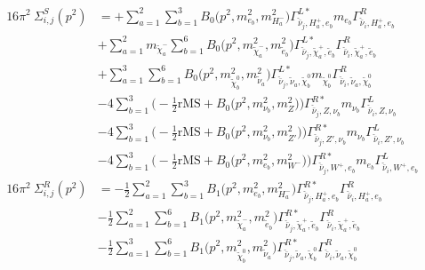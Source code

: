 \begin{itemize}
\begin{align} 
16\pi^2 \ \Sigma^S_{i,j}(p^2) &= +\sum_{a=1}^{2}\sum_{b=1}^{3}{B_0\Big(p^{2},m^2_{e_{{b}}},m^2_{H^-_{{a}}}\Big)} {\Gamma^{L*}_{\check{\bar{\nu}}_{{j}},H^+_{{a}},e_{{b}}}} m_{e_{{b}}} {\Gamma^R_{\check{\bar{\nu}}_{{i}},H^+_{{a}},e_{{b}}}} \nonumber \\ 
 &+\sum_{a=1}^{2}m_{\tilde{\chi}^-_{{a}}} \sum_{b=1}^{6}{B_0\Big(p^{2},m^2_{\tilde{\chi}^-_{{a}}},m^2_{\tilde{e}_{{b}}}\Big)} {\Gamma^{L*}_{\check{\bar{\nu}}_{{j}},\tilde{\chi}^+_{{a}},\tilde{e}_{{b}}}} {\Gamma^R_{\check{\bar{\nu}}_{{i}},\tilde{\chi}^+_{{a}},\tilde{e}_{{b}}}}  \nonumber \\ 
 &+\sum_{a=1}^{3}\sum_{b=1}^{6}{B_0\Big(p^{2},m^2_{\tilde{\chi}^0_{{b}}},m^2_{\tilde{\nu}_{{a}}}\Big)} {\Gamma^{L*}_{\check{\bar{\nu}}_{{j}},\tilde{\nu}_{{a}},\tilde{\chi}^0_{{b}}}} m_{\tilde{\chi}^0_{{b}}} {\Gamma^R_{\check{\bar{\nu}}_{{i}},\tilde{\nu}_{{a}},\tilde{\chi}^0_{{b}}}} \nonumber \\ 
 &-4 \sum_{b=1}^{3}\Big(-\frac{1}{2} \text{rMS}  + {B_0\Big(p^{2},m^2_{\nu_{{b}}},m^2_{Z}\Big)}\Big){\Gamma^{R*}_{\check{\bar{\nu}}_{{j}},Z,\nu_{{b}}}} m_{\nu_{{b}}} {\Gamma^L_{\check{\bar{\nu}}_{{i}},Z,\nu_{{b}}}}  \nonumber \\ 
 &-4 \sum_{b=1}^{3}\Big(-\frac{1}{2} \text{rMS}  + {B_0\Big(p^{2},m^2_{\nu_{{b}}},m^2_{{Z'}}\Big)}\Big){\Gamma^{R*}_{\check{\bar{\nu}}_{{j}},{Z'},\nu_{{b}}}} m_{\nu_{{b}}} {\Gamma^L_{\check{\bar{\nu}}_{{i}},{Z'},\nu_{{b}}}}  \nonumber \\ 
 &-4 \sum_{b=1}^{3}\Big(-\frac{1}{2} \text{rMS}  + {B_0\Big(p^{2},m^2_{e_{{b}}},m^2_{W^-}\Big)}\Big){\Gamma^{R*}_{\check{\bar{\nu}}_{{j}},W^+,e_{{b}}}} m_{e_{{b}}} {\Gamma^L_{\check{\bar{\nu}}_{{i}},W^+,e_{{b}}}}  \\ 
16\pi^2 \ \Sigma^R_{i,j}(p^2) &= -\frac{1}{2} \sum_{a=1}^{2}\sum_{b=1}^{3}{B_1\Big(p^{2},m^2_{e_{{b}}},m^2_{H^-_{{a}}}\Big)} {\Gamma^{R*}_{\check{\bar{\nu}}_{{j}},H^+_{{a}},e_{{b}}}} {\Gamma^R_{\check{\bar{\nu}}_{{i}},H^+_{{a}},e_{{b}}}}  \nonumber \\ 
 &-\frac{1}{2} \sum_{a=1}^{2}\sum_{b=1}^{6}{B_1\Big(p^{2},m^2_{\tilde{\chi}^-_{{a}}},m^2_{\tilde{e}_{{b}}}\Big)} {\Gamma^{R*}_{\check{\bar{\nu}}_{{j}},\tilde{\chi}^+_{{a}},\tilde{e}_{{b}}}} {\Gamma^R_{\check{\bar{\nu}}_{{i}},\tilde{\chi}^+_{{a}},\tilde{e}_{{b}}}}  \nonumber \\ 
 &-\frac{1}{2} \sum_{a=1}^{3}\sum_{b=1}^{6}{B_1\Big(p^{2},m^2_{\tilde{\chi}^0_{{b}}},m^2_{\tilde{\nu}_{{a}}}\Big)} {\Gamma^{R*}_{\check{\bar{\nu}}_{{j}},\tilde{\nu}_{{a}},\tilde{\chi}^0_{{b}}}} {\Gamma^R_{\check{\bar{\nu}}_{{i}},\tilde{\nu}_{{a}},\tilde{\chi}^0_{{b}}}}  \nonumber \\ 

\end{align}
\end{itemize}
